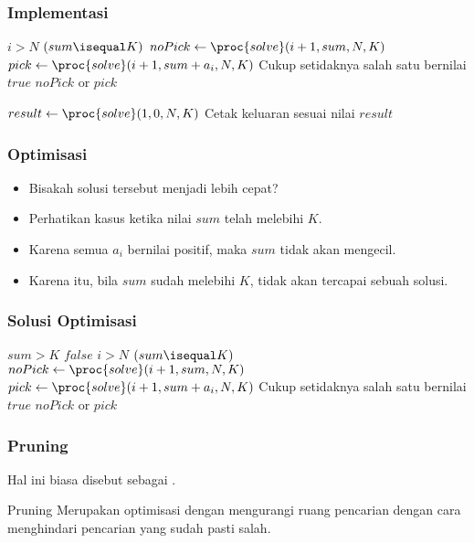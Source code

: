 \begin{frame}
\frametitle{Implementasi}
\begin{codebox}
\li \If $i > N$ \Then
\li   \Return $(sum \isequal K)$
\li \Else 
\li   $noPick \gets \proc{solve}(i+1, sum, N, K)$
\li   $pick \gets \proc{solve}(i+1, sum + a_i, N, K)$
\li   \Comment Cukup setidaknya salah satu bernilai $true$
\li   \Return $noPick$ or $pick$
    \End
\end{codebox}

\begin{codebox}
\li $result \gets \proc{solve}(1, 0, N, K)$
\li \Comment Cetak keluaran sesuai nilai $result$
\end{codebox}
\end{frame}

\begin{frame}
\frametitle{Optimisasi}
\begin{itemize}
  \item Bisakah solusi tersebut menjadi lebih cepat?
  \item Perhatikan kasus ketika nilai $sum$ telah melebihi $K$.
  \item Karena semua $a_i$ bernilai positif, maka $sum$ tidak akan mengecil.
  \item Karena itu, bila $sum$ sudah melebihi $K$,  tidak akan tercapai sebuah solusi.
\end{itemize}
\end{frame}

\begin{frame}
\frametitle{Solusi Optimisasi}
\begin{codebox}
\li \If $sum > K$ \Then
\li   \Return $false$
    \End
\zi
\li \If $i > N$ \Then
\li   \Return $(sum \isequal K)$
\li \Else 
\li   $noPick \gets \proc{solve}(i+1, sum, N, K)$
\li   $pick \gets \proc{solve}(i+1, sum + a_i, N, K)$
\li   \Comment Cukup setidaknya salah satu bernilai $true$
\li   \Return $noPick$ or $pick$
    \End
\end{codebox}
\end{frame}

\begin{frame}
\frametitle{Pruning}
Hal ini biasa disebut sebagai .
\begin{block}{Pruning}
  Merupakan optimisasi dengan mengurangi ruang pencarian dengan cara menghindari pencarian yang sudah pasti salah.
\end{block}
\end{frame}

